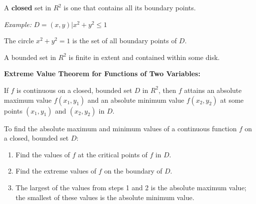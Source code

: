     \par A \textbf{closed} set in $R^{2}$ is one that contains all its boundary
      points.
    \par \textit{Example:} $D = {(x, y) | x^{2} + y^{2} \leq 1}$
    \par The circle $x^{2} + y^{2} = 1$ is the set of all boundary points
    of $D$.
    \par A bounded set in $R^{2}$ is finite in extent and contained within
    some disk.
    \par \textbf{Extreme Value Theorem for Functions of Two Variables:}
    \par If $f$ is continuous on a closed, bounded set $D$ in $R^{2}$, then $f$
    attains an absolute maximum value $f(x_{1}, y_{1})$ and an absolute
    minimum value $f(x_{2}, y_{2})$ at some points $(x_{1}, y_{1})$ and
    $(x_{2}, y_{2})$ in $D$.
    \par To find the absolute maximum and minimum values of a continuous
    function $f$ on a closed, bounded set $D$:
    \begin{enumerate}
      \item Find the values of $f$ at the critical points of $f$ in $D$.
      \item Find the extreme values of $f$ on the boundary of $D$.
      \item The largest of the values from steps 1 and 2 is the absolute
      maximum value; the smallest of these values is the absolute minimum
      value.
    \end{enumerate}

\newpage


